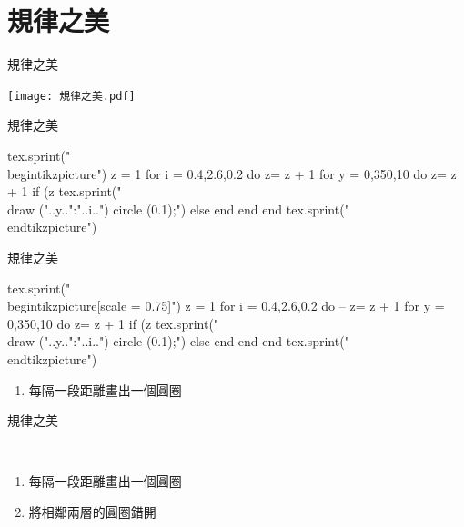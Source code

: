 \section{規律之美}
\begin{tcolorbox}
規律之美
\end{tcolorbox}
\begin{figbox}
\centering
\texttt{[image: 規律之美.pdf]}
\end{figbox}
\newpage
\begin{tcolorbox}
規律之美
\end{tcolorbox}
\begin{figbox}
\centering
\begin{luacode}
tex.sprint("\\begin{tikzpicture}")
z = 1
for i = 0.4,2.6,0.2 do
z= z + 1
	for y = 0,350,10 do
	z= z + 1
		if (z%
			tex.sprint("\\draw ("..y..":"..i..") circle (0.1);")
		else
		end
	end
end
tex.sprint("\\end{tikzpicture}")
\end{luacode}
\end{figbox}
\newpage
\begin{tcolorbox}
規律之美
\end{tcolorbox}
\begin{figbox}
\begin{multicols}{2}
\begin{luacode}
tex.sprint("\\begin{tikzpicture}[scale = 0.75]")
z = 1
for i = 0.4,2.6,0.2 do
-- z= z + 1
	for y = 0,350,10 do
	z= z + 1
		if (z%
			tex.sprint("\\draw ("..y..":"..i..") circle (0.1);")
		else
		end
	end
end
tex.sprint("\\end{tikzpicture}")
\end{luacode}
\columnbreak
\begin{Large}
\begin{enumerate}
\item 每隔一段距離畫出一個圓圈
\end{enumerate}
\end{Large}
\end{multicols}
\end{figbox}
\newpage
\begin{tcolorbox}
規律之美
\end{tcolorbox}
\begin{figbox}
\begin{multicols}{2}
\\
\columnbreak
\begin{Large}
\begin{enumerate}
\item 每隔一段距離畫出一個圓圈
\item 將相鄰兩層的圓圈錯開
\end{enumerate}
\end{Large}
\end{multicols}
\end{figbox}
\newpage
